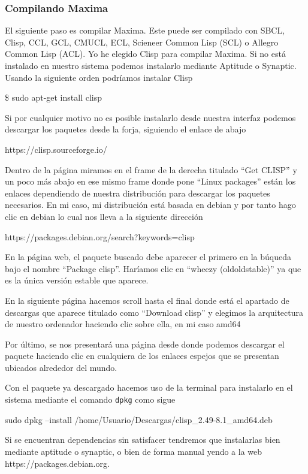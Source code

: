 \documentclass[a4paper, 12pt] {article}
\begin{document}
\subsubsection{Compilando Maxima}
El siguiente paso es compilar Maxima. Este puede ser compilado con SBCL, Clisp, CCL, GCL, CMUCL, ECL, Scieneer Common Lisp (SCL) o Allegro Common Lisp (ACL).
Yo he elegido Clisp para compilar Maxima. Si no está instalado en nuestro sistema podemos instalarlo mediante Aptitude o Synaptic. Usando la siguiente orden podríamos instalar Clisp
\begin{center}
\$ sudo apt-get install clisp
\end{center}
Si por cualquier motivo no es posible instalarlo desde nuestra interfaz podemos descargar los paquetes desde la forja, siguiendo el enlace de abajo
\begin{center}
  https://clisp.sourceforge.io/ 
\end{center}
Dentro de la página miramos en el frame de la derecha titulado ``Get CLISP'' y un poco más abajo en ese mismo frame donde pone ``Linux packages'' están los enlaces dependiendo de nuestra distribución para descargar los paquetes necesarios.
En mi caso, mi distribución está basada en debian y por tanto hago clic en debian lo cual nos lleva a la siguiente dirección
\begin{center}
  https://packages.debian.org/search?keywords=clisp
\end{center}
En la página web, el paquete buscado debe aparecer el primero en la búqueda bajo el nombre ``Package clisp''. Haríamos clic en ``wheezy (oldoldstable)'' ya que es la única versión estable que aparece.

En la siguiente página hacemos scroll hasta el final donde está el apartado de descargas que aparece titulado como ``Download clisp'' y elegimos la arquitectura de nuestro ordenador haciendo clic sobre ella, en mi caso amd64

Por último, se nos presentará una página desde donde podemos descargar el paquete haciendo clic en cualquiera de los enlaces espejos que se presentan ubicados alrededor del mundo.

Con el paquete ya descargado hacemos uso de la terminal para instalarlo en el sistema mediante el comando \texttt{dpkg} como sigue

\begin{center}
sudo dpkg --install /home/Usuario/Descargas/clisp\_2.49-8.1\_amd64.deb 

\end{center}
Si se encuentran dependencias sin satisfacer tendremos que instalarlas bien mediante aptitude o synaptic, o bien de forma manual yendo a la web https://packages.debian.org.
\end{document}
